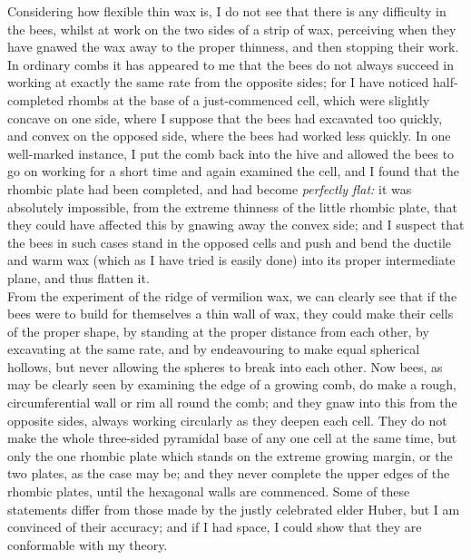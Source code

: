 \indent Considering how flexible thin wax is, I do not see that there is any difficulty in the bees, whilst at work on the two sides of a strip of wax, perceiving when they have gnawed the wax away to the proper thinness, and then stopping their work. In ordinary combs it has appeared to me that the bees do not always succeed in working at exactly the same rate from the opposite sides; for I have noticed half-completed rhombs at the base of a just-commenced cell, which were slightly concave on one side, where I suppose that the bees had excavated too quickly, and convex on the opposed side, where the bees had worked less quickly. In one well-marked instance, I put the comb back into the hive and allowed the bees to go on working for a short time and again examined the cell, and I found that the rhombic plate had been completed, and had become \emph{perfectly flat:} it was absolutely impossible, from the extreme thinness of the little rhombic plate, that they could have affected this by gnawing away the convex side; and I suspect that the bees in such cases stand in the opposed cells and push and bend the ductile and warm wax (which as I have tried is easily done) into its proper intermediate plane, and thus flatten it.\\
\indent From the experiment of the ridge of vermilion wax, we can clearly see that if the bees were to build for themselves a thin wall of wax, they could make their cells of the proper shape, by standing at the proper distance from each other, by excavating at the same rate, and by endeavouring to make equal spherical hollows, but never allowing the spheres to break into each other. Now bees, as may be clearly seen by examining the edge of a growing comb, do make a rough, circumferential wall or rim all round the comb; and they gnaw into this from the opposite sides, always working circularly as they deepen each cell. They do not make the whole three-sided pyramidal base of any one cell at the same time, but only the one rhombic plate which stands on the extreme growing margin, or the two plates, as the case may be; and they never complete the upper edges of the rhombic plates, until the hexagonal walls are commenced. Some of these statements differ from those made by the justly celebrated elder Huber, but I am convinced of their accuracy; and if I had space, I could show that they are conformable with my theory.\\
